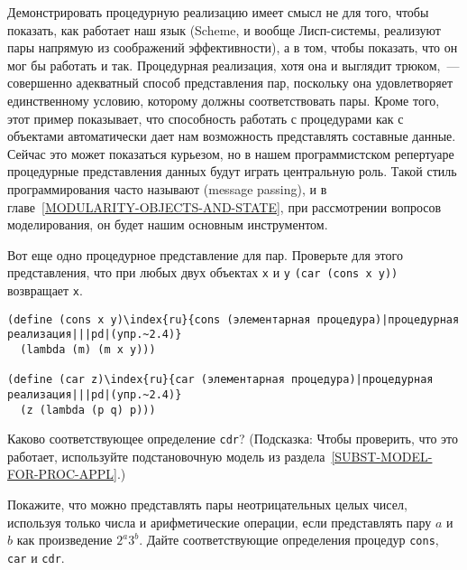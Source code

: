 Демонстрировать процедурную реализацию имеет смысл не для того,
чтобы показать, как работает наш язык (Scheme,
и вообще Лисп-системы, реализуют пары напрямую из соображений
эффективности), а в том, чтобы показать, что он мог бы работать и
так.  Процедурная реализация, хотя она и выглядит трюком,~--- совершенно
адекватный способ представления пар, поскольку она удовлетворяет
единственному условию, которому должны соответствовать пары.  Кроме
того, этот пример показывает, что способность работать с процедурами
как с объектами автоматически дает нам возможность представлять
составные данные.  Сейчас это может показаться курьезом, но в нашем
программистском репертуаре процедурные представления данных будут
играть центральную роль.  Такой стиль программирования часто называют
 (message passing), 
и в главе~\ref{MODULARITY-OBJECTS-AND-STATE},
при рассмотрении вопросов моделирования, он будет нашим основным инструментом.
\begin{exercise}{2.4}\label{EX2.4}%
Вот еще одно процедурное представление для пар.
Проверьте для этого представления, что при любых двух объектах
{\tt x} и {\tt y} {\tt (car (cons x y))}
возвращает {\tt x}.

\begin{Verbatim}[fontsize=\small]
(define (cons x y)\index{ru}{cons (элементарная процедура)|процедурная реализация|||pd|(упр.~2.4)}
  (lambda (m) (m x y)))

(define (car z)\index{ru}{car (элементарная процедура)|процедурная реализация|||pd|(упр.~2.4)}
  (z (lambda (p q) p)))
\end{Verbatim}
Каково соответствующее определение {\tt cdr}? 
(Подсказка: Чтобы 
проверить, что это работает, используйте подстановочную модель из
раздела~\ref{SUBST-MODEL-FOR-PROC-APPL}.)
\end{exercise}
\begin{exercise}{2.5}\label{EX2.5}%
Покажите, что можно представлять пары неотрицательных
целых чисел, используя только числа и арифметические операции, если
представлять пару $a$ и $b$ как
произведение $2^a 3^b$.  Дайте соответствующие определения
процедур {\tt cons}, {\tt car} и 
{\tt cdr}.
\end{exercise}
